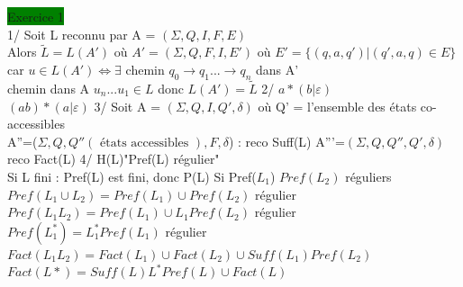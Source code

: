 \documentclass{article}
\begin{document}
\noindent \colorbox{green}{Exercice 1}\\
1/ Soit L reconnu par A = \((\Sigma, Q, I, F, E)\)\\
Alors \(\tilde{L} = L(A')\) où \(A'=(\Sigma, Q, F, I, E')\)
où \(E'=\{(q,a,q')|(q',a,q)\in E\}\)\\
car \(u \in L(A') \Leftrightarrow \exists\) chemin \(q_0 \to q_1 ... \to q_n\) dans A'\\
chemin dans A
\(u_n...u_1 \in L\)
donc \(L(A') = \tilde{L}\)
2/ \(a*(b|\varepsilon)\)\\
\((ab)*(a|\varepsilon)\)
3/ Soit A = \((\Sigma, Q, I, Q', \delta)\) où Q' = l'ensemble des 
états co-accessibles\\
A''=(\(\Sigma, Q, Q''(\text{ états accessibles }), F, \delta\)) : reco Suff(L)
A'''=\((\Sigma, Q, Q'', Q', \delta)\) reco Fact(L)
4/ H(L)"Pref(L) régulier"\\
Si L fini : Pref(L) est fini, donc P(L)
Si Pref(\(L_1\)) \(Pref(L_2)\) réguliers\\
\(Pref(L_1 \cup L_2) = Pref(L_1) \cup Pref(L_2)\) régulier\\
\(Pref(L_1L_2) = Pref(L_1)\cup L_1 Pref(L_2)\) régulier\\
\(Pref(L_1^*) = L_1^*Pref(L_1)\) régulier\\
\(Fact(L_1 L_2) = Fact(L_1) \cup Fact(L_2) \cup Suff(L_1)Pref(L_2)\)\\
\(Fact(L*) = Suff(L)L^*Pref(L) \cup Fact(L)\)
\end{document}
